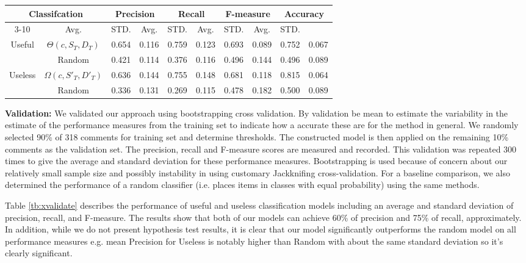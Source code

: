 \begin{table*}[!t]
\caption{Results from bootstrapping cross validation of our classification models against random models}
\small
\centering
\def\arraystretch{1.2}
\begin{tabular}{cccc|cc|cc|cc}
\hline
\multicolumn{2}{c}{Classifcation}   & \multicolumn{2}{c|}{Precision} & \multicolumn{2}{c|}{Recall} & \multicolumn{2}{c|}{F-measure} & \multicolumn{2}{c}{Accuracy} \\ \cline{3-10}
\multicolumn{2}{c}{Models} & Avg. & STD. & Avg. & STD. & Avg. & STD. & Avg. & STD. \\ \hline \hline
\multirow{2}{*}{Useful} & $\Theta(c,S_T,D_T)$    &  0.654 & 0.116 &  0.759 & 0.123 & 0.693 & 0.089 & 0.752 & 0.067 \\ \cline{2-10}
& Random     &  0.421 & 0.114 &  0.376 & 0.116 & 0.496 & 0.144 & 0.496 & 0.089 \\ \hline
\multirow{2}{*}{Useless}  & $\Omega(c,S'_T,D'_T)$  &  0.636 & 0.144 &  0.755 & 0.148 & 0.681 & 0.118 & 0.815 & 0.064 \\ \cline{2-10}
& Random    &  0.336 & 0.131 &  0.269 & 0.115 & 0.478 & 0.182 & 0.500 & 0.089 \\
\hline
\end{tabular}
\label{tb:xvalidate}
\end{table*}


\textbf{Validation:}
We validated our approach using bootstrapping cross validation. By validation be mean to estimate the variability in the estimate of the 
performance measures from the training set to indicate how a accurate these are for the method in general.
We randomly selected 90\% of 318 comments for training set and determine thresholds.
The constructed model is then applied on the remaining 10\% comments as the validation set.
The precision, recall and F-measure scores are measured and recorded.
This validation was repeated 300 times to give the average and standard deviation for these performance measures. Bootstrapping is 
used because of concern about our relatively small sample size and possibly instability in using customary Jackknifing cross-validation.
For a baseline comparison, we also determined the performance of a random classifier (i.e. places items in classes with equal probability) using the same methods.

Table \ref{tb:xvalidate} describes the performance of useful and useless classification models including an average and standard deviation of precision, recall, and F-measure.
The results show that both of our models can achieve 60\% of precision and 75\% of recall, approximately.
In addition, while we do not present hypothesis test results, it is clear that our model significantly outperforms the random model on all performance measures e.g. mean Precision for Useless is notably higher than Random with about the same standard deviation so it's clearly significant. 


